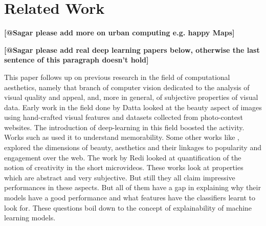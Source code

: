 \section{Related Work}

\textbf{[@Sagar please add more on urban computing e.g. happy Maps]}


\textbf{[@Sagar please add real deep learning papers below, otherwise the last sentence of this paragraph doesn't hold]}

This paper follows up on previous research in the field of computational aesthetics, namely that branch of computer vision dedicated to the analysis of visual quality and appeal, and, more in general, of subjective properties of visual data.
Early work in the field done by Datta \cite{datta2008algorithmic} looked at the beauty aspect of images using hand-crafted visual features and datasets collected from photo-contest websites. The introduction of deep-learning in this field boosted the activity. Works such as \cite{Isola2011} used it to understand memorability. Some other works like \cite{khosla2014makes,Wang:2015:USA:2832415.2832579,schifanella2015image} , explored the dimensions of beauty, aesthetics and their linkages to popularity and engagement over the web. The work by Redi \cite{redi20146} looked at quantification of the notion of creativity in the short microvideos. These works look at properties which are abstract and very subjective. But still they all claim impressive performances in these aspects. But all of them have a gap in explaining why their models have a good performance and what features have the classifiers learnt to look for. These questions boil down to the concept of explainability of machine learning models. 

